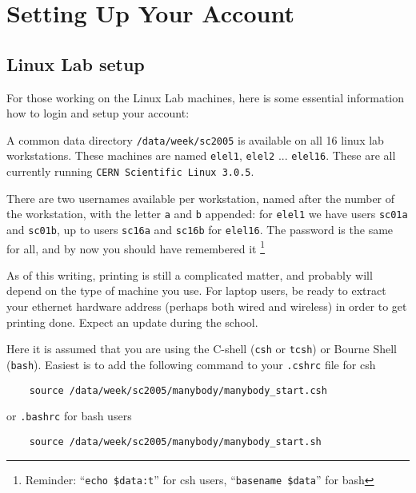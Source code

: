 \appendix
\chapter                {Setting Up Your Account}

\section{Linux Lab setup}

For those working on the Linux Lab machines, here is some essential 
information how to login and setup your account:

A common data directory {\tt /data/week/sc2005} is available on all 16
linux lab workstations. These machines are 
named {\tt elel1}, {\tt elel2} ... {\tt elel16}. 
These are all currently running {\tt CERN Scientific Linux 3.0.5}.

There are two usernames available per workstation, named after the number
of the workstation, with the letter {\tt a} and {\tt b} appended:
for {\tt elel1} we have users {\tt sc01a} and {\tt sc01b},
up to 
users {\tt sc16a} and {\tt sc16b} for {\tt elel16}. The password is
the same for all, and by now you should have remembered it
\footnote{Reminder: ``{\tt echo \$data:t}'' for csh users, ``{\tt basename \$data}''
for bash}

As of this writing, printing is still a complicated matter, and probably 
will depend on the type
of machine you use. For laptop users, be ready to extract your ethernet hardware
address (perhaps both wired and wireless) in order to get printing done.
Expect an update during the school.

Here it is assumed that you are using 
the C-shell ({\tt csh} or {\tt tcsh}) or Bourne Shell  ({\tt bash}).
Easiest is to add the following  command to your {\tt .cshrc} file
for csh

\begin{verbatim}
    source /data/week/sc2005/manybody/manybody_start.csh
\end{verbatim}
or {\tt .bashrc} for bash users
\begin{verbatim}
    source /data/week/sc2005/manybody/manybody_start.sh
\end{verbatim}

